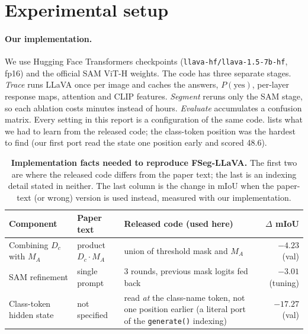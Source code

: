 \documentclass{article}
\newcommand{\method}{FSeg-LLaVA}
\newcommand{\miou}{mIoU}
\newcommand{\negv}[1]{\textcolor{negred}{#1}}
\begin{document}
\section{Experimental setup}
\label{sec:setup}

\paragraph{Our implementation.} We use Hugging Face Transformers checkpoints
(\texttt{llava-hf/llava-1.5-7b-hf}, fp16) and the official SAM ViT-H weights. The code has three
separate stages. \emph{Trace} runs LLaVA once per image and caches the answers, $P(\text{yes})$,
per-layer response maps, attention and CLIP features. \emph{Segment} reruns only the SAM stage, so
each ablation costs minutes instead of hours. \emph{Evaluate} accumulates a confusion matrix. Every
setting in this report is a configuration of the same code.  lists what we had to
learn from the released code; the class-token position was the hardest to find (our first port read
the state one position early and scored 48.6).

\begin{table}[t]
  \centering
  \caption{\textbf{Implementation facts needed to reproduce \method{}.} The first two are where the
  released code differs from the paper text; the last is an indexing detail stated in neither. The
  last column is the change in \miou{} when the paper-text (or wrong) version is used instead,
  measured with our implementation.}
  \label{tab:diffs}
  \small
  \begin{tabular}{@{}p{3.4cm}p{2.4cm}p{4.7cm}r@{}}
    \toprule
    \textbf{Component} & \textbf{Paper text} & \textbf{Released code (used here)} & \textbf{$\Delta$ \miou{}}\\
    \midrule
    Combining $D_c$ with $M_A$ & product $D_c\cdot M_A$ & union of threshold mask and $M_A$ & \negv{$-4.23$} (val)\\
    SAM refinement & single prompt & 3 rounds, previous mask logits fed back & \negv{$-3.01$} (tuning)\\
    Class-token hidden state & not specified & read \emph{at} the class-name token, not one position
      earlier (a literal port of the \texttt{generate()} indexing) & \negv{$-17.27$} (val)\\
    \bottomrule
  \end{tabular}
\end{table}
\end{document}
